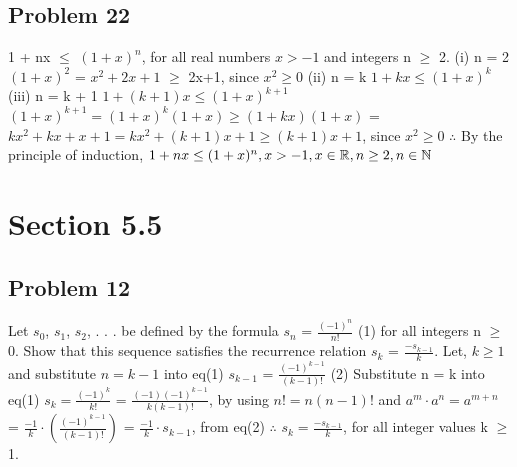 \documentclass{article}
\begin{document}
	\subsection*{Problem 22}
	1 + nx $\leq$ $(1 + x)^{n}$, for all real numbers $x > -1$ and integers n $\geq$ 2.
	\newline
	(i) n = 2
	\newline
	$(1+x)^{2}$ = $x^{2}+2x+1$ $\geq$ 2x+1, since $x^{2} \geq 0$
	\newline
	(ii) n = k
	\newline
	$1+kx \leq (1+x)^{k}$
	\newline
	(iii) n = k + 1
	\newline
	$1+(k+1)x \leq (1+x)^{k+1}$
	\newline
	$(1+x)^{k+1} = (1+x)^{k}(1+x) \geq (1+kx)(1+x)$ 
	\newline
	= $kx^{2}+kx+x+1 = kx^{2}+(k+1)x+1 \geq (k+1)x+1$, since $x^{2} \geq 0$
	\newline
	$\therefore$ By the principle of induction, $1+nx \leq (1+x)^{n}, x > -1, x \in {\Bbb R}, n \geq 2, n \in {\Bbb N}$
	
	\section*{Section 5.5}
	\subsection*{Problem 12}
	Let $s_{0}$, $s_{1}$, $s_{2}$, . . . be defined by the formula $s_{n}$ = $\frac{(-1)^{n}}{n!}$ (1) for all integers n $\geq$ 0. Show that this sequence satisfies the recurrence relation $s_{k}$ = $\frac{-s_{k-1}}{k}$.
	\newline
	Let, $k \geq 1$ and substitute $n = k-1$ into eq(1)
	\newline
	$s_{k-1}$ = $\frac{(-1)^{k-1}}{(k-1)!}$ (2)
	\newline
	Substitute n = k into eq(1)
	\newline
	$s_{k} = \frac{(-1)^{k}}{k!}$
	\newline
	= $\frac{(-1)(-1)^{k-1}}{k(k-1)!}$, by using $n! = n(n-1)!$ and $a^{m} \cdot a^{n} = a^{m+n}$
	\newline
	= $\frac{-1}{k} \cdot (\frac{(-1)^{k-1}}{(k-1)!})$
	\newline
	= $\frac{-1}{k} \cdot s_{k-1}$, from eq(2)
	\newline
	$\therefore$ $s_{k} = \frac{-s_{k-1}}{k}$, for all integer values k $\geq$ 1.
	
\end{document}
